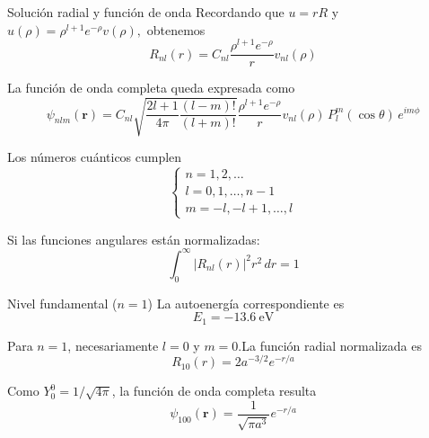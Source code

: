 \begin{frame}{Solución radial y función de onda}
    Recordando que $u=rR$ y
    \(
        u(\rho)=\rho^{l+1}e^{-\rho}v(\rho),
    \)
    obtenemos
    \begin{equation}
        R_{nl}(r)=
        C_{nl}\frac{\rho^{l+1}e^{-\rho}}{r}
        v_{nl}(\rho)
    \end{equation}
        
    La función de onda completa queda expresada como
    \[
        \boxed{
        \psi_{nlm}(\mathbf r)=
        C_{nl}\sqrt{\frac{2l+1}{4\pi}\frac{(l-m)!}{(l+m)!}}\frac{\rho^{l+1}e^{-\rho}}{r}v_{nl}(\rho)\,P_l^m(\cos\theta)\, e^{im\phi}
        }
    \]

    Los números cuánticos cumplen
    \[
        \begin{cases}
            n=1,2,\ldots\\
            l=0,1,\ldots,n-1\\
            m=-l,-l+1,\ldots,l
        \end{cases}
    \]

    Si las funciones angulares están normalizadas:
    \[
        \boxed{
        \int_0^\infty |R_{nl}(r)|^2r^2\,dr=1
        }
    \]

\end{frame}
\begin{frame}{Nivel fundamental ($n=1$)}
 La autoenergía correspondiente es
    \[
        \boxed{E_1=-13.6\ \mathrm{eV}}
    \]

    Para $n=1$, necesariamente $l=0$ y $m=0$.La función radial normalizada es
    \[
        \boxed{
        R_{10}(r)=2a^{-3/2}e^{-r/a}
        }
    \]

    Como $Y_0^0=1/\sqrt{4\pi}$, la función de onda completa resulta
    \[
        \boxed{
        \psi_{100}(\mathbf r)=
        \frac{1}{\sqrt{\pi a^3}}e^{-r/a}
        }
    \]

    \vspace{0.3cm}

   
\end{frame}

